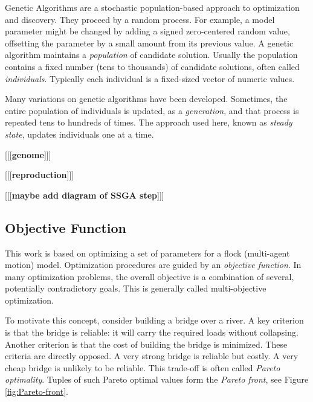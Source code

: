 \documentclass[letterpaper]{article}
\begin{document}
Genetic Algorithms are a stochastic population-based approach to optimization and discovery. They proceed by a random process. For example, a model parameter might be changed by adding a signed zero-centered random value, offsetting the parameter by a small amount from its previous value. A genetic algorithm maintains a \textit{population} of candidate solution. Usually the population contains a fixed number (tens to thousands) of candidate solutions, often called \textit{individuals}. Typically each individual is a fixed-sized vector of numeric values.

Many variations on genetic algorithms have been developed. Sometimes, the entire population of individuals is updated, as a \textit{generation}, and that process is repeated tens to hundreds of times. The approach used here, known as \textit{steady state}, updates individuals one at a time.

[[[\textbf{genome}]]]

[[[\textbf{reproduction}]]]

[[[\textbf{maybe add diagram of SSGA step}]]]

\subsection{Objective Function}
\label{subsec:Objective_Function}

This work is based on optimizing a set of parameters for a flock (multi-agent motion) model. Optimization procedures are guided by an \textit{objective function}. In many optimization problems, the overall objective is a combination of several, potentially contradictory goals. This is generally called multi-objective optimization. 

To motivate this concept, consider building a bridge over a river. A key criterion is that the bridge is reliable: it will carry the required loads without collapsing. Another criterion is that the cost of building the bridge is minimized. These criteria are directly opposed. A very strong bridge is reliable but costly. A very cheap bridge is unlikely to be reliable. This trade-off is often called \textit{Pareto optimality}. Tuples of such Pareto optimal values form the \textit{Pareto front}, see Figure \ref{fig:Pareto-front}.

\end{document}
